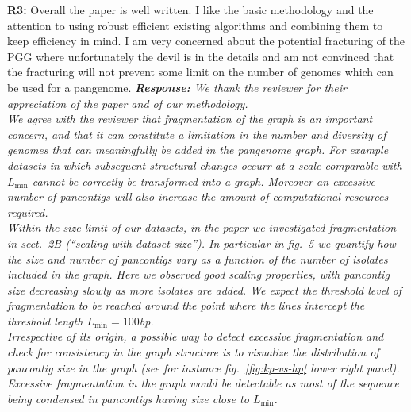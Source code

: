 \documentclass[aps,rmp,onecolumn]{revtex4-1}
\newcommand{\Lthr}{L_{\min}}
\newcommand{\Marco}[1]{{\color{orange}Marco: #1}}
\newcommand{\reviewer}[2]{\textbf{#1:} #2\vskip 5mm}
\newcommand{\response}[1]{{\it {\color{response}\textbf{Response:} #1}}\vskip 5mm}
\begin{document}
\reviewer{R3}{Overall the paper is well written. I like the basic methodology and the attention to using robust efficient existing algorithms and combining them to keep efficiency in mind. I am very concerned about the potential fracturing of the PGG where unfortunately the devil is in the details and am not convinced that the fracturing will not prevent some limit on the number of genomes which can be used for a pangenome.}
\response{
      We thank the reviewer for their appreciation of the paper and of our methodology.\\
      We agree with the reviewer that fragmentation of the graph is an important concern, and that it can constitute a limitation in the number and diversity of genomes that can meaningfully be added in the pangenome graph. For example datasets in which subsequent structural changes occurr at a scale comparable with $\Lthr$ cannot be correctly be transformed into a graph. Moreover an excessive number of pancontigs will also increase the amount of computational resources required.\\
      Within the size limit of our datasets, in the paper we investigated fragmentation in sect.~2B (``\textit{scaling with dataset size}''). In particular in fig.~5 we quantify how the size and number of pancontigs vary as a function of the number of isolates included in the graph. Here we observed good scaling properties, with pancontig size decreasing slowly as more isolates are added. We expect the threshold level of fragmentation to be reached around the point where the lines intercept the threshold length $\Lthr = 100$bp.\\

      Irrespective of its origin, a possible way to detect excessive fragmentation and check for consistency in the graph structure is to visualize the distribution of pancontig size in the graph (see for instance fig.~\ref{fig:kp-vs-hp} lower right panel). Excessive fragmentation in the graph would be detectable as most of the sequence being condensed in pancontigs having size close to $\Lthr$.\\
}
\end{document}
